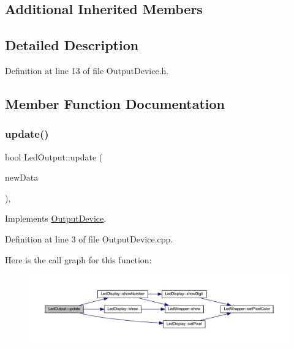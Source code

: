 \subsection*{Additional Inherited Members}


\subsection{Detailed Description}


Definition at line 13 of file Output\+Device.\+h.



\subsection{Member Function Documentation}
\mbox{\label{class_led_output_a553af18fe51a31ee3d5b94d9598503da}} 
\subsubsection{\texorpdfstring{update()}{update()}}
{\footnotesize\ttfamily bool Led\+Output\+::update (\begin{DoxyParamCaption}\item[{\hyperlink{struct_scoreboard_data}{Scoreboard\+Data}}]{new\+Data }\end{DoxyParamCaption})\hspace{0.3cm}{\ttfamily [override]}, {\ttfamily [virtual]}}



Implements \hyperlink{class_output_device_a9a5f6cf0655bd1c63639b593b10dbced}{Output\+Device}.



Definition at line 3 of file Output\+Device.\+cpp.

Here is the call graph for this function\+:
\nopagebreak
\begin{figure}[H]
\begin{center}
\leavevmode
\includegraphics[width=350pt]{class_led_output_a553af18fe51a31ee3d5b94d9598503da_cgraph}
\end{center}
\end{figure}


